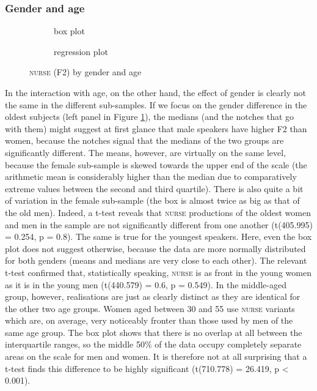 \subsubsection{Gender and age}
\label{sec.prod.res.vow.nurse.f2.genderage}

\begin{figure}[h!]
	\centering
	\begin{subfigure}{.49\textwidth}
		\centering
			\resizebox{\linewidth}{!}{} 
		\caption{box plot}
		\label{fig.box.f2w.nurse.genderage}
	\end{subfigure}
	\begin{subfigure}{.49\textwidth}
		\centering
			\resizebox{\linewidth}{!}{} 
		\caption{regression plot}
		\label{fig.scatter.f2w.nurse.genderage}
	\end{subfigure}
	\caption{\textsc{nurse} (F2) by gender and age}
\end{figure}

In the interaction with age, on the other hand, the effect of gender is clearly not the same in the different sub-samples.
If we focus on the gender difference in the oldest subjects (left panel in Figure \ref{fig.box.f2w.nurse.genderage}), the medians (and the notches that go with them) might suggest at first glance that male speakers have higher F2 than women, because the notches signal that the medians of the two groups are significantly different.
The means, however, are virtually on the same level, because the female sub-sample is skewed towards the upper end of the scale (the arithmetic mean is considerably higher than the median due to comparatively extreme values between the second and third quartile).
There is also quite a bit of variation in the female sub-sample (the box is almost twice as big as that of the old men).
Indeed, a t-test reveals that \textsc{nurse} productions of the oldest women and men in the sample are not significantly different from one another (t(405.995) = 0.254, p = 0.8).
The same is true for the youngest speakers.
Here, even the box plot does not suggest otherwise, because the data are more normally distributed for both genders (means and medians are very close to each other).
The relevant t-test confirmed that, statistically speaking, \textsc{nurse} is as front in the young women as it is in the young men (t(440.579) = 0.6, p = 0.549).
In the middle-aged group, however, realisations are just as clearly distinct as they are identical for the other two age groups.
Women aged between 30 and 55 use \textsc{nurse} variants which are, on average, very noticeably fronter than those used by men of the same age group.
The box plot shows that there is no overlap at all between the interquartile ranges, so the middle 50\% of the data occupy completely separate areas on the scale for men and women.
It is therefore not at all surprising that a t-test finds this difference to be highly significant (t(710.778) = 26.419, p < 0.001).

